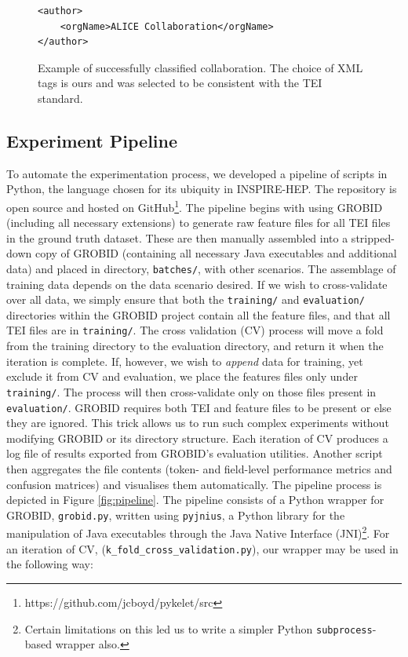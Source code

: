 \begin{figure}[t]
\lstset{language=XML}
\begin{lstlisting}
<author>
    <orgName>ALICE Collaboration</orgName>
</author>
\end{lstlisting}
\caption{Example of successfully classified collaboration. The choice of XML tags is ours and was selected to be consistent with the TEI standard.}
\label{fig:collaboration}
\end{figure}

\subsection{Experiment Pipeline}
\label{subsec:pipeline}

To automate the experimentation process, we developed a pipeline of scripts in Python, the language chosen for its ubiquity in INSPIRE-HEP. The repository is open source and hosted on GitHub\footnote{https://github.com/jcboyd/pykelet/src}. The pipeline begins with using GROBID (including all necessary extensions) to generate raw feature files for all TEI files in the ground truth dataset. These are then manually assembled into a stripped-down copy of GROBID (containing all necessary Java executables and additional data) and placed in directory, \texttt{batches/}, with other scenarios. The assemblage of training data depends on the data scenario desired. If we wish to cross-validate over all data, we simply ensure that both the \texttt{training/} and \texttt{evaluation/} directories within the GROBID project contain all the feature files, and that all TEI files are in \texttt{training/}. The cross validation (CV) process will move a fold from the training directory to the evaluation directory, and return it when the iteration is complete. If, however, we wish to \emph{append} data for training, yet exclude it from CV and evaluation, we place the features files only under \texttt{training/}. The process will then cross-validate only on those files present in \texttt{evaluation/}. GROBID requires both TEI and feature files to be present or else they are ignored. This trick allows us to run such complex experiments without modifying GROBID or its directory structure. Each iteration of CV produces a log file of results exported from GROBID's evaluation utilities. Another script then aggregates the file contents (token- and field-level performance metrics and confusion matrices) and visualises them automatically. The pipeline process is depicted in Figure \ref{fig:pipeline}. The pipeline consists of a Python wrapper for GROBID, \texttt{grobid.py}, written using \texttt{pyjnius}, a Python library for the manipulation of Java executables through the Java Native Interface (JNI)\footnote{Certain limitations on this led us to write a simpler Python \texttt{subprocess}-based wrapper also.}. For an iteration of CV, (\texttt{k\_fold\_cross\_validation.py}), our wrapper may be used in the following way:\\

